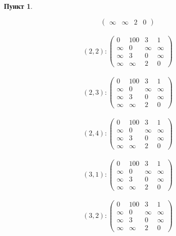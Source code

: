\documentclass[11pt,a4paper]{scrarticle}
\theoremstyle{definition}
\newtheorem{subtask}{Пункт}
\begin{document}
\begin{subtask}
\begin{multicols}{2}
$$\begin{pmatrix}
                \infty & \infty & 2      & 0
            \end{pmatrix}$$\\
        $$(2, 2): \begin{pmatrix}
                0      & 100    & 3      & 1      \\
                \infty & 0      & \infty & \infty \\
                \infty & 3      & 0      & \infty \\
                \infty & \infty & 2      & 0
            \end{pmatrix}$$\\
        $$(2, 3): \begin{pmatrix}
                0      & 100    & 3      & 1      \\
                \infty & 0      & \infty & \infty \\
                \infty & 3      & 0      & \infty \\
                \infty & \infty & 2      & 0
            \end{pmatrix}$$\\
        $$(2, 4): \begin{pmatrix}
                0      & 100    & 3      & 1      \\
                \infty & 0      & \infty & \infty \\
                \infty & 3      & 0      & \infty \\
                \infty & \infty & 2      & 0
            \end{pmatrix}$$\\
        $$(3, 1): \begin{pmatrix}
                0      & 100    & 3      & 1      \\
                \infty & 0      & \infty & \infty \\
                \infty & 3      & 0      & \infty \\
                \infty & \infty & 2      & 0
            \end{pmatrix}$$\\
        $$(3, 2): \begin{pmatrix}
                0      & 100    & 3      & 1      \\
                \infty & 0      & \infty & \infty \\
                \infty & 3      & 0      & \infty \\
                \infty & \infty & 2      & 0
            \end{pmatrix}$$\\

\end{multicols}
\end{subtask}
\end{document}
